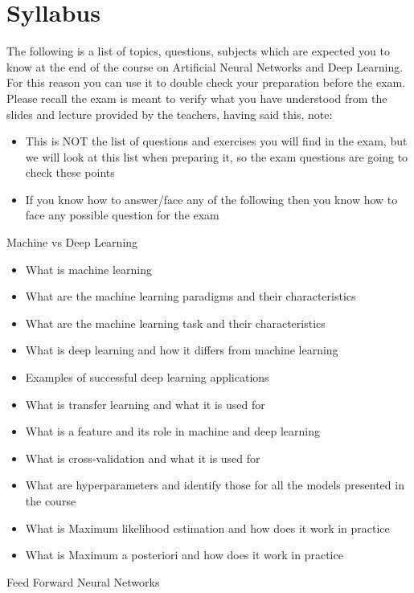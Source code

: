 
\section{Syllabus}

The following is a list of topics, questions, subjects which are expected you to know at the end of the course on Artificial Neural Networks and Deep Learning. For this reason you can use it to double check your preparation before the exam.
Please recall the exam is meant to verify what you have understood from the slides and lecture provided by the teachers, having said this, note:
\begin{itemize}
    \item This is NOT the list of questions and exercises you will find in the exam, but we will look at this list when preparing it, so the exam questions are going to check these points
    \item If you know how to answer/face any of the following then you know how to face any possible question for the exam
\end{itemize}
Machine vs Deep Learning
\begin{itemize}
    \item What is machine learning
    \item What are the machine learning paradigms and their characteristics
    \item What are the machine learning task and their characteristics
    \item What is deep learning and how it differs from machine learning
    \item Examples of successful deep learning applications
    \item What is transfer learning and what it is used for
    \item What is a feature and its role in machine and deep learning
    \item What is cross-validation and what it is used for
    \item What are hyperparameters and identify those for all the models presented in the course
    \item What is Maximum likelihood estimation and how does it work in practice
    \item What is Maximum a posteriori and how does it work in practice
\end{itemize}
Feed Forward Neural Networks

